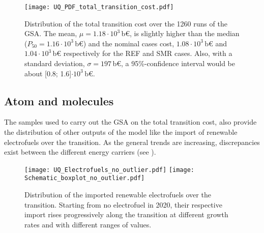 \begin{figure}[htbp!]
\centering
\texttt{[image: UQ\_PDF\_total\_transition\_cost.pdf]}
\caption{Distribution of the total transition cost over the 1260 runs of the \acrfull{GSA}. The mean, $\mu=1.18\cdot10^3$\,b€, is slightly higher than the median ($P_{50}=1.16\cdot10^3$\,b€) and the nominal cases cost, $1.08\cdot10^3$\,b€ and $1.04\cdot10^3$\,b€ respectively for the REF and SMR cases. Also, with a standard deviation, $\sigma=197$\,b€, a 95\%-confidence interval would be about [0.8; 1.6]$\cdot10^3$\,b€.}
\label{fig:UQ_PDF_total_transition_cost}
\end{figure}

\subsection{Atom and molecules}
\label{subsec:atom_mol:results_atom_mol}
The samples used to carry out the \gls{GSA} on the total transition cost, also provide the distribution of other outputs of the model like the import of renewable electrofuels over the transition. As the general trends are increasing, discrepancies exist between the different energy carriers (see ).
%

\begin{figure}[htbp!]
\centering
\texttt{[image: UQ\_Electrofuels\_no\_outlier.pdf]}
\texttt{[image: Schematic\_boxplot\_no\_outlier.pdf]}
\caption{Distribution of the imported renewable electrofuels over the transition. Starting from no electrofuel in 2020, their respective import rises progressively along the transition at different growth rates and with different ranges of values. }
\label{fig:results_uq_electrofuels}
\end{figure}

